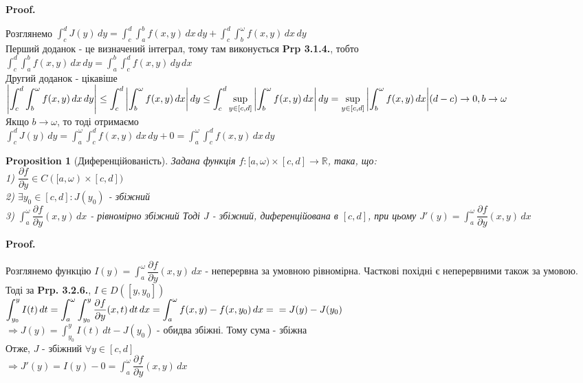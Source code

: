 \documentclass[a4paper, 10pt]{article}
\makeatletter
\def\departial#1#2{\dfrac{\partial {#1}}{\partial {#2}}}
\def\huge{\displaystyle}
\def\qed{$\blacksquare$}
\theoremstyle{theoremdd}
\theoremstyle{theoremdd}
\theoremstyle{theoremdd}
\theoremstyle{theoremdd}
\theoremstyle{theoremdd}
\newtheorem{proposition}[theorem]{Proposition}
\theoremstyle{theoremdd}
\theoremstyle{theoremdd}
\theoremstyle{theoremdd}
\renewenvironment{proof}[1][Proof.\\]{\par
\pushQED{\hfill \qed}%
\normalfont \topsep6\p@\@plus6\p@\relax
\trivlist
\item\relax
{\bfseries
#1\@addpunct{.}}\hspace\labelsep\ignorespaces
}{%
\popQED\endtrivlist\@endpefalse
}
\makeatother
\begin{document}
\begin{proof}
Розглянемо $\huge \int_c^d J(y)\,dy = \int_c^d \int_a^b f(x,y)\,dx\,dy + \int_c^d \int_b^\omega f(x,y)\,dx\,dy$\\
Перший доданок - це визначений інтеграл, тому там виконується \textbf{Prp 3.1.4.}, тобто\\
$\huge \int_c^d \int_a^b f(x,y)\,dx\,dy = \int_a^b \int_c^d f(x,y)\,dy\,dx$\\
Другий доданок - цікавіше\\
$\huge \abs{\int_c^d \int_b^\omega f(x,y)\,dx\,dy} \leq \int_c^d \abs{\int_b^\omega f(x,y)\,dx}\,dy \leq \int_c^d \sup_{y \in [c,d]} \abs{\int_b^\omega f(x,y)\,dx}\,dy = \sup_{y \in [c,d]} \abs{\int_b^\omega f(x,y)\,dx} (d-c) \to 0, b \to \omega$\\
Якщо $b \to \omega$, то тоді отримаємо\\
$\huge \int_c^d J(y)\,dy = \huge \int_a^\omega \int_c^d f(x,y)\,dx\,dy + 0 = \huge \int_a^\omega \int_c^d f(x,y)\,dx\,dy$
\end{proof}

\begin{proposition}[Диференційованість]
Задана функція $f: [a,\omega) \times [c,d] \to \mathbb{R}$, така, що:\\
1) $\departial{f}{y} \in C([a,\omega) \times [c,d])$\\
2) $\exists y_0 \in [c,d]: J(y_0)$ - збіжний\\
3) $\huge \int_a^\omega \departial{f}{y}(x,y)\,dx$ - рівномірно збіжний
Тоді $J$ - збіжний, диференційована в $[c,d]$, при цьому $J'(y) = \huge \int_a^\omega \departial{f}{y}(x,y)\,dx$
\end{proposition}

\begin{proof}
Розглянемо функцію $I(y) = \huge \int_a^\omega \departial{f}{y}(x,y)\,dx$ - неперервна за умовною рівномірна. Часткові похідні є неперервними також за умовою. Тоді за \textbf{Prp. 3.2.6.}, $I \in D([y,y_0])$\\
$\huge \int_{y_0}^y I(t)\,dt = \huge \int_a^\omega \int_{y_0}^y \departial{f}{y}(x,t)\,dt\,dx = \int_a^\omega f(x,y)-f(x,y_0)\,dx = \\ = J(y) - J(y_0)$\\
$\Rightarrow J(y) = \huge \int_{y_0}^y I(t)\,dt - J(y_0)$ - обидва збіжні. Тому сума - збіжна\\
Отже, $J$ - збіжний $\forall y \in [c,d]$\\
$\Rightarrow J'(y) = I(y) - 0 = \huge \int_a^\omega \departial{f}{y}(x,y)\,dx$
\end{proof}
\end{document}
